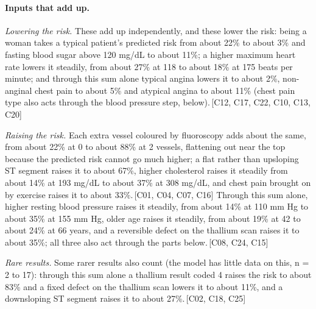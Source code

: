 \documentclass[a4paper,10pt]{article}
\newif\ifreviewmarks
\newcommand{\reviewrule}{\noindent{\color{BrickRed}\rule{\linewidth}{0.8pt}}}
\newenvironment{drafted}[1][]{%
  \ifreviewmarks\par\addvspace{\medskipamount}\reviewrule\par\nopagebreak
  \noindent{\color{BrickRed}\sffamily\footnotesize\textbf{Thesis Draft}\quad #1\hfill review}\par\nopagebreak\smallskip\fi}{%
  \ifreviewmarks\par\smallskip\noindent{\color{BrickRed}\sffamily\footnotesize end of thesis draft}\par\nopagebreak\reviewrule\par\medskip\fi}
\begin{document}
\begin{drafted}[plain-language layer: heart-s5-c1]
\paragraph{Inputs that add up.} \par\noindent\textit{Lowering the risk.}  These add up independently, and these lower the risk: being a woman takes a typical patient's predicted risk from about 22\% to about 3\% and fasting blood sugar above 120 mg/dL to about 11\%; a higher maximum heart rate lowers it steadily, from about 27\% at 118 to about 18\% at 175 beats per minute; and through this sum alone typical angina lowers it to about 2\%, non-anginal chest pain to about 5\% and atypical angina to about 11\% (chest pain type also acts through the blood pressure step, below).\,{\scriptsize\textcolor{NavyBlue}{[C12, C17, C22, C10, C13, C20]}} \par\noindent\textit{Raising the risk.}  Each extra vessel coloured by fluoroscopy adds about the same, from about 22\% at 0 to about 88\% at 2 vessels, flattening out near the top because the predicted risk cannot go much higher; a flat rather than upsloping ST segment raises it to about 67\%, higher cholesterol raises it steadily from about 14\% at 193 mg/dL to about 37\% at 308 mg/dL, and chest pain brought on by exercise raises it to about 33\%.\,{\scriptsize\textcolor{NavyBlue}{[C01, C04, C07, C16]}} Through this sum alone, higher resting blood pressure raises it steadily, from about 14\% at 110 mm Hg to about 35\% at 155 mm Hg, older age raises it steadily, from about 19\% at 42 to about 24\% at 66 years, and a reversible defect on the thallium scan raises it to about 35\%; all three also act through the parts below.\,{\scriptsize\textcolor{NavyBlue}{[C08, C24, C15]}} \par\noindent\textit{Rare results.}  Some rarer results also count (the model has little data on this, n = 2 to 17): through this sum alone a thallium result coded 4 raises the risk to about 83\% and a fixed defect on the thallium scan lowers it to about 11\%, and a downsloping ST segment raises it to about 27\%.\,{\scriptsize\textcolor{NavyBlue}{[C02, C18, C25]}}

\end{drafted}
\end{document}

